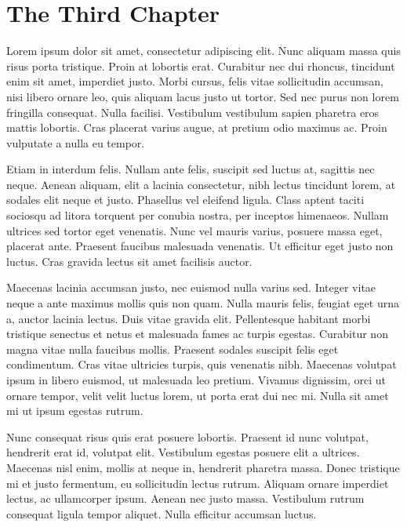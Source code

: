 
\newpage
\chapter{The Third Chapter}


Lorem ipsum dolor sit amet, consectetur adipiscing elit. Nunc aliquam massa quis risus porta tristique. Proin at lobortis erat. Curabitur nec dui rhoncus, tincidunt enim sit amet, imperdiet justo. Morbi cursus, felis vitae sollicitudin accumsan, nisi libero ornare leo, quis aliquam lacus justo ut tortor. Sed nec purus non lorem fringilla consequat. Nulla facilisi. Vestibulum vestibulum sapien pharetra eros mattis lobortis. Cras placerat varius augue, at pretium odio maximus ac. Proin vulputate a nulla eu tempor.

Etiam in interdum felis. Nullam ante felis, suscipit sed luctus at, sagittis nec neque. Aenean aliquam, elit a lacinia consectetur, nibh lectus tincidunt lorem, at sodales elit neque et justo. Phasellus vel eleifend ligula. Class aptent taciti sociosqu ad litora torquent per conubia nostra, per inceptos himenaeos. Nullam ultrices sed tortor eget venenatis. Nunc vel mauris varius, posuere massa eget, placerat ante. Praesent faucibus malesuada venenatis. Ut efficitur eget justo non luctus. Cras gravida lectus sit amet facilisis auctor.

Maecenas lacinia accumsan justo, nec euismod nulla varius sed. Integer vitae neque a ante maximus mollis quis non quam. Nulla mauris felis, feugiat eget urna a, auctor lacinia lectus. Duis vitae gravida elit. Pellentesque habitant morbi tristique senectus et netus et malesuada fames ac turpis egestas. Curabitur non magna vitae nulla faucibus mollis. Praesent sodales suscipit felis eget condimentum. Cras vitae ultricies turpis, quis venenatis nibh. Maecenas volutpat ipsum in libero euismod, ut malesuada leo pretium. Vivamus dignissim, orci ut ornare tempor, velit velit luctus lorem, ut porta erat dui nec mi. Nulla sit amet mi ut ipsum egestas rutrum.

Nunc consequat risus quis erat posuere lobortis. Praesent id nunc volutpat, hendrerit erat id, volutpat elit. Vestibulum egestas posuere elit a ultrices. Maecenas nisl enim, mollis at neque in, hendrerit pharetra massa. Donec tristique mi et justo fermentum, eu sollicitudin lectus rutrum. Aliquam ornare imperdiet lectus, ac ullamcorper ipsum. Aenean nec justo massa. Vestibulum rutrum consequat ligula tempor aliquet. Nulla efficitur accumsan luctus.

